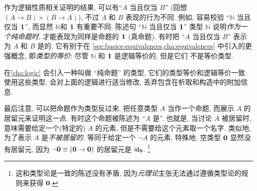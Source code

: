 作为逻辑性质相关证明的结果, 可以有``$A$ 当且仅当 $B$'' (回想 $(A\to B)\times (B\to A)$), 不过 $A$ 和 $B$ 表现的行为不同.
例如, 容易校验 ``$\mathbb{N}$ 当且仅当 $\unit$'', 而显然 $\mathbb{N}$和 $\unit$ 有重要不同.
陈述句 ``$\mathbb{N}$ 当且仅当 $\unit$'' 类型 $\mathbb{N}$ 说明\emph{作为一个纯命题时}, 才能表现为同样是命题的 $\unit$ (真命题).
有时把 ``$A$ 当且仅当 $B$'' 表示为 $A$ 和 $B$ 是的.
%
%
它有别于在  \cref{sec:basics-equivalences,cha:equivalences} 中引入的更强概念, 即\emph{类型的等价}: 尽管 $\mathbb{N}$ 和 $\unit$ 是逻辑等价的, 但是它们 不是等价类型.

在\cref{cha:logic} 会引入一种叫做 ``纯命题'' 的类型, 它们的类型等价和逻辑等价一致.
使用这些类型, 会对上面的逻辑进行适当修改,  丢弃包含在析取和构造中的附加信息.

最后注意, 可以把命题作为类型反过来, 把任意类型 $A$ 当作一个命题, 而展示 $A$ 的居留元来证明这一点.
有时这个命题被陈述为 ``$A$ 是''.
%
%
也就是, 当讨论 $A$ 被居留时, 意味需要给定一个(特定的) $A$ 的元素, 但是不需要给这个元素取一个名字.
类似地, 为了表示 $A$ 是\emph{不被居留的}, 等同于给定一个 $\neg A$ 的元素.
特殊地, 空类型 $\emptyt$ 显然没有居留元, 因为 $\neg \emptyt \jdeq (\emptyt \to \emptyt)$ 的居留元是 $\idfunc[\emptyt]$.
\footnote{这和类型论是一致的陈述没有矛盾, 因为\emph{元理论}主张无法通过遵循类型论的规则来获得 $\emptyt$.}

%
%
%